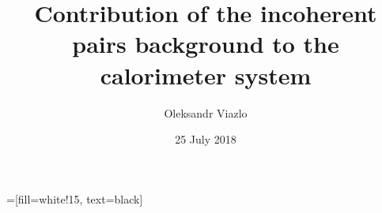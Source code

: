\documentclass[8pt]{beamer}
\newif\ifplacelogo %
\begin{document}
\newcommand{\myNode}{\tikz[baseline,inner sep=1pt] \node[anchor=base]}

 =[fill=white!15, text=black]



\title[Calorimetry performance with CLD \hspace{14.0em}\insertframenumber/
\inserttotalframenumber]{Contribution of the incoherent pairs background to the calorimeter system}


	\author[Oleksandr Viazlo]{Oleksandr Viazlo\\ 
	{\small }
	}
	
       
	\date{25 July 2018}


	

   	

\placelogofalse
\end{document}
